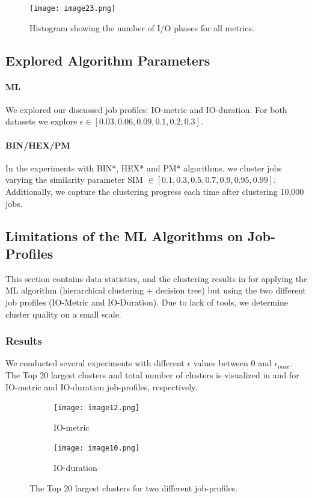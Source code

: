 \documentclass{jhps}
\begin{document}


\begin{figure}
  \centering
  \texttt{[image: image23.png]}
  \caption{Histogram showing the number of I/O phases for all metrics.}
  \label{fig:phases_stats}
\end{figure}


\subsection{Explored Algorithm Parameters}
\paragraph{ML}
We explored our discussed job profiles: IO-metric and IO-duration.
For both datasets we explore $\epsilon \in [0.03, 0.06, 0.09, 0.1, 0.2, 0.3]$.

\paragraph{BIN/HEX/PM}
In the experiments with BIN*, HEX* and PM* algorithms, we cluster jobs varying the similarity parameter SIM $\in [0.1, 0.3, 0.5, 0.7, 0.9, 0.95, 0.99]$.
Additionally, we capture the clustering progress each time after clustering 10,000 jobs.


\subsection{Limitations of the ML Algorithms on Job-Profiles}
This section contains data statistics, and the clustering results in  for applying the ML algorithm (hierarchical clustering + decision tree) but using the two different job profiles (IO-Metric and IO-Duration).
Due to lack of tools, we determine cluster quality on a small scale.


\subsubsection{Results}
We conducted several experiments with different $\epsilon$ values between 0 and $\epsilon_{max}$.
The Top 20 largest clusters and total number of clusters is visualized in  and  for IO-metric and IO-duration job-profiles, respectively.

\begin{figure}
 \begin{subfigure}[t]{0.45\textwidth}
	\texttt{[image: image12.png]}
	\caption{IO-metric}
	\label{fig:datasets_clustering_results:io_metric}
 \end{subfigure}
 \hfill
	\begin{subfigure}[t]{0.45\textwidth}
	\texttt{[image: image10.png]}
	\caption{IO-duration}
	\label{fig:datasets_clustering_results:io_duration}
 \end{subfigure}

 \caption{The Top 20 largest clusters for two different job-profiles.}
 \label{fig:datasets_clustering_results}
\end{figure}
\end{document}
